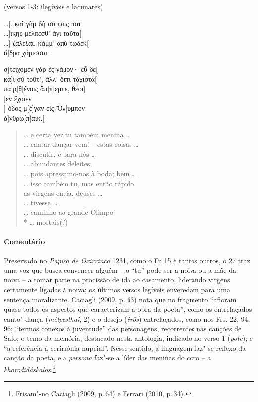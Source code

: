 \begin{gkverse}
\textnormal{(versos 1-3: ilegíveis e lacunares)}

\ldots{}]. καὶ γὰρ δὴ σὺ πάις ποτ[\\
\ldots{}]ικ̣ης μέλπεσθ’ ἄγι ταῦτα[\\
\ldots{}] ζάλεξαι, κἄμμ’ ἀπὺ τωδεκ[\\
ἄ]δρα χάρισσαι·

σ]τείχομεν γὰρ ἐς γάμον· εὖ δε[\\
κα]ὶ σὺ τοῦτ’, ἀλλ’ ὄττι τάχιστα[\\
πα]ρ̣[θ]ένοις ἄπ[π]εμπε, θέοι[\\
]εν ἔχοιεν\\
      ] ὄδος̣ μ[έ]γαν εἰς Ὄλ[υμπον\\
       ἀ]νθρω[π\qquad]αίκ.[
\end{gkverse}
\pagebreak
\begin{verse}
\ldots{} e certa vez tu também menina \ldots{}\\
\ldots{} cantar-dançar vem! -- estas coisas \ldots{}\\
\ldots{} discutir, e para nós \ldots{}\\
\ldots{} abundantes deleites;\\
\ldots{} pois apressamo-nos à boda; bem \ldots{}\\
\ldots{} isso também tu, mas então rápido\\
as virgens envia, deuses \ldots{}\\
\ldots{} tivesse \ldots{}\\
\ldots{} caminho ao grande Olimpo\\*
\ldots{} mortais(?)
\end{verse}

{\paragraph{Comentário} Preservado no \textit{Papiro de Oxirrinco} 1231, como o Fr.\,15 e tantos outros, o 27 traz uma voz que busca convencer alguém  -- o ``tu''
pode ser a noiva ou a mãe da noiva -- a tomar parte na procissão de
ida ao casamento, liderando virgens certamente ligadas à noiva; os últimos versos
legíveis enveredam para uma sentença moralizante.
Caciagli (2009, p. 63) nota que no fragmento “afloram quase todos os aspectos que caracterizam a obra da poeta'', como os entrelaçados canto"-dança (\textit{mélpesthai}, 2) e o desejo (\textit{érōs}) entrelaçados, como nos Frs. 22, 94, 96; ``termos conexos à juventude'' das personagens, recorrentes nas canções de Safo; o temo da memória, destacado nesta antologia, indicado no verso 1 (\textit{pote}); e ``a referência à cerimônia nupcial''. Nesse sentido, a linguagem faz"-se reflexo da canção da poeta, e a \textit{persona} faz"-se a líder das meninas do coro -- a \textit{khorodidáskalos}.\footnote{Frisam"-no Caciagli (2009, p.\,64) e Ferrari (2010, p.\,34).}}



